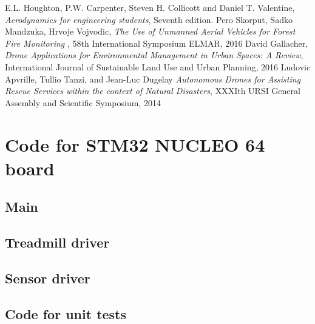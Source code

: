 \documentclass[12pt,a4paper]{article}
\begin{document}
\begin{thebibliography}{100}
	 E.L. Houghton, P.W. Carpenter, Steven H. Collicott and Daniel T. Valentine, \textit{Aerodynamics for engineering students}, Seventh edition.
	 Pero Skorput, Sadko Mandzuka, Hrvoje Vojvodic, \textit{The Use of Unmanned Aerial Vehicles for Forest Fire Monitoring }, 58th International Symposium ELMAR, 2016
	 David Gallacher, \textit{Drone Applications for Environmental Management in Urban Spaces: A Review}, International Journal of Sustainable Land Use and Urban Planning, 2016
	 Ludovic Apvrille, Tullio Tanzi, and Jean-Luc Dugelay \textit{Autonomous Drones for Assisting Rescue Services within the context of Natural Disasters}, XXXIth URSI General Assembly and Scientific Symposium, 2014
\end{thebibliography}

\listoffigures
\listoftables
\appendix
\section{Code for STM32 NUCLEO 64 board}
\subsection{Main}


\subsection{Treadmill driver}


\subsection{Sensor driver}


\subsection{Code for unit tests}








\end{document}

